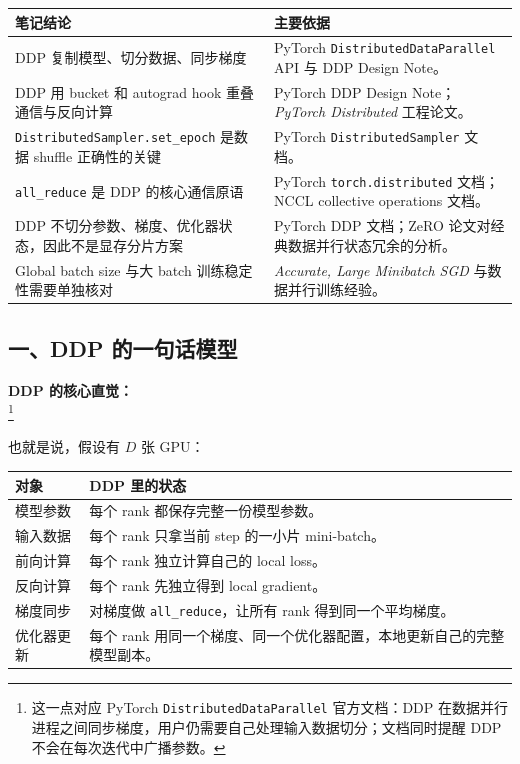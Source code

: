 \begin{center}
{\small
\begin{tabular}{p{3.4cm}p{9.4cm}}
\hline
\textbf{笔记结论} & \textbf{主要依据} \\
\hline
DDP 复制模型、切分数据、同步梯度 & PyTorch \texttt{DistributedDataParallel} API 与 DDP Design Note。 \\
DDP 用 bucket 和 autograd hook 重叠通信与反向计算 & PyTorch DDP Design Note；\emph{PyTorch Distributed} 工程论文。 \\
\texttt{DistributedSampler.set\_epoch} 是数据 shuffle 正确性的关键 & PyTorch \texttt{DistributedSampler} 文档。 \\
\texttt{all\_reduce} 是 DDP 的核心通信原语 & PyTorch \texttt{torch.distributed} 文档；NCCL collective operations 文档。 \\
DDP 不切分参数、梯度、优化器状态，因此不是显存分片方案 & PyTorch DDP 文档；ZeRO 论文对经典数据并行状态冗余的分析。 \\
Global batch size 与大 batch 训练稳定性需要单独核对 & \emph{Accurate, Large Minibatch SGD} 与数据并行训练经验。 \\
\hline
\end{tabular}
}
\end{center}

\subsection{一、DDP 的一句话模型}

\begin{summarybox}
\textbf{DDP 的核心直觉：}\\
\footnote{这一点对应 PyTorch \texttt{DistributedDataParallel} 官方文档：DDP 在数据并行进程之间同步梯度，用户仍需要自己处理输入数据切分；文档同时提醒 DDP 不会在每次迭代中广播参数。}
\end{summarybox}

也就是说，假设有 $D$ 张 GPU：

\begin{center}
{\small
\begin{tabular}{p{3.2cm}p{9.7cm}}
\hline
\textbf{对象} & \textbf{DDP 里的状态} \\
\hline
模型参数 & 每个 rank 都保存完整一份模型参数。 \\
输入数据 & 每个 rank 只拿当前 step 的一小片 mini-batch。 \\
前向计算 & 每个 rank 独立计算自己的 local loss。 \\
反向计算 & 每个 rank 先独立得到 local gradient。 \\
梯度同步 & 对梯度做 \texttt{all\_reduce}，让所有 rank 得到同一个平均梯度。 \\
优化器更新 & 每个 rank 用同一个梯度、同一个优化器配置，本地更新自己的完整模型副本。 \\
\hline
\end{tabular}
}
\end{center}

